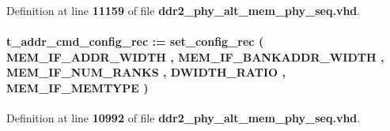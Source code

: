 Definition at line {\bf 11159} of file {\bf ddr2\+\_\+phy\+\_\+alt\+\_\+mem\+\_\+phy\+\_\+seq.\+vhd}.

\paragraph[{c\+\_\+seq\+\_\+addr\+\_\+cmd\+\_\+config}]{ {\bfseries {\bfseries {\bf t\+\_\+addr\+\_\+cmd\+\_\+config\+\_\+rec}} \textcolor{vhdlchar}{ }\textcolor{vhdlchar}{ }\textcolor{vhdlchar}{\+:}\textcolor{vhdlchar}{=}\textcolor{vhdlchar}{ }\textcolor{vhdlchar}{ }\textcolor{vhdlchar}{ }\textcolor{vhdlchar}{ }\textcolor{vhdlchar}{set\+\_\+config\+\_\+rec}\textcolor{vhdlchar}{ }\textcolor{vhdlchar}{(}\textcolor{vhdlchar}{ }\textcolor{vhdlchar}{ }\textcolor{vhdlchar}{ }\textcolor{vhdlchar}{ }{\bfseries {\bf M\+E\+M\+\_\+\+I\+F\+\_\+\+A\+D\+D\+R\+\_\+\+W\+I\+D\+TH}} \textcolor{vhdlchar}{ }\textcolor{vhdlchar}{,}\textcolor{vhdlchar}{ }\textcolor{vhdlchar}{ }\textcolor{vhdlchar}{ }\textcolor{vhdlchar}{ }{\bfseries {\bf M\+E\+M\+\_\+\+I\+F\+\_\+\+B\+A\+N\+K\+A\+D\+D\+R\+\_\+\+W\+I\+D\+TH}} \textcolor{vhdlchar}{ }\textcolor{vhdlchar}{,}\textcolor{vhdlchar}{ }\textcolor{vhdlchar}{ }\textcolor{vhdlchar}{ }\textcolor{vhdlchar}{ }{\bfseries {\bf M\+E\+M\+\_\+\+I\+F\+\_\+\+N\+U\+M\+\_\+\+R\+A\+N\+KS}} \textcolor{vhdlchar}{ }\textcolor{vhdlchar}{,}\textcolor{vhdlchar}{ }\textcolor{vhdlchar}{ }\textcolor{vhdlchar}{ }\textcolor{vhdlchar}{ }{\bfseries {\bf D\+W\+I\+D\+T\+H\+\_\+\+R\+A\+T\+IO}} \textcolor{vhdlchar}{ }\textcolor{vhdlchar}{,}\textcolor{vhdlchar}{ }\textcolor{vhdlchar}{ }\textcolor{vhdlchar}{ }\textcolor{vhdlchar}{ }{\bfseries {\bf M\+E\+M\+\_\+\+I\+F\+\_\+\+M\+E\+M\+T\+Y\+PE}} \textcolor{vhdlchar}{ }\textcolor{vhdlchar}{)}\textcolor{vhdlchar}{ }} \hspace{0.3cm}{\ttfamily [Constant]}}\label{classddr2__phy__alt__mem__phy__dgwb_1_1rtl_a87e441041cc5383db33bb3ee070d0267}


Definition at line {\bf 10992} of file {\bf ddr2\+\_\+phy\+\_\+alt\+\_\+mem\+\_\+phy\+\_\+seq.\+vhd}.

